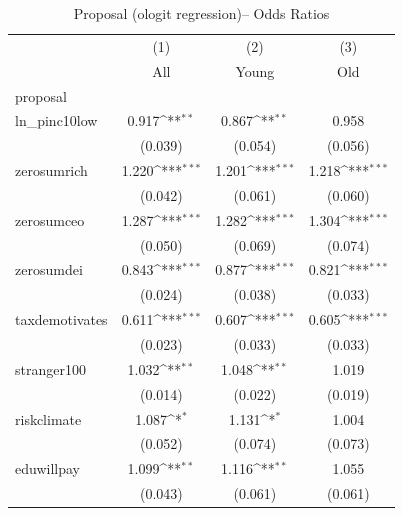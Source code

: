 \begin{table}[htbp]\centering
\def\sym#1{\ifmmode^{#1}\else\(^{#1}\)\fi}
\caption{Proposal (ologit regression)-- Odds Ratios}
\begin{tabular}{l*{3}{c}}
\toprule
            &\multicolumn{1}{c}{(1)}&\multicolumn{1}{c}{(2)}&\multicolumn{1}{c}{(3)}\\
            &\multicolumn{1}{c}{All}&\multicolumn{1}{c}{Young}&\multicolumn{1}{c}{Old}\\
\midrule
proposal    &                     &                     &                     \\
ln\_pinc10low&       0.917\sym{**} &       0.867\sym{**} &       0.958         \\
            &     (0.039)         &     (0.054)         &     (0.056)         \\
\addlinespace
zerosumrich &       1.220\sym{***}&       1.201\sym{***}&       1.218\sym{***}\\
            &     (0.042)         &     (0.061)         &     (0.060)         \\
\addlinespace
zerosumceo  &       1.287\sym{***}&       1.282\sym{***}&       1.304\sym{***}\\
            &     (0.050)         &     (0.069)         &     (0.074)         \\
\addlinespace
zerosumdei  &       0.843\sym{***}&       0.877\sym{***}&       0.821\sym{***}\\
            &     (0.024)         &     (0.038)         &     (0.033)         \\
\addlinespace
taxdemotivates&       0.611\sym{***}&       0.607\sym{***}&       0.605\sym{***}\\
            &     (0.023)         &     (0.033)         &     (0.033)         \\
\addlinespace
stranger100 &       1.032\sym{**} &       1.048\sym{**} &       1.019         \\
            &     (0.014)         &     (0.022)         &     (0.019)         \\
\addlinespace
riskclimate &       1.087\sym{*}  &       1.131\sym{*}  &       1.004         \\
            &     (0.052)         &     (0.074)         &     (0.073)         \\
\addlinespace
eduwillpay  &       1.099\sym{**} &       1.116\sym{**} &       1.055         \\
            &     (0.043)         &     (0.061)         &     (0.061)         \\

\end{tabular}
\end{table}
